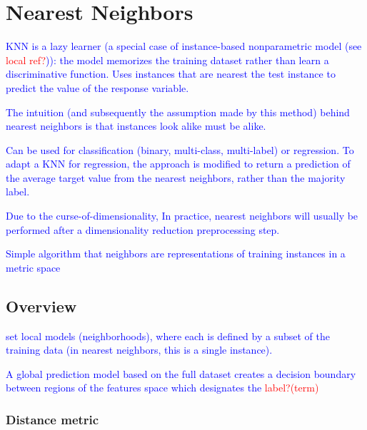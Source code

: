 \section{Nearest Neighbors}

\textcolor{blue}{KNN is a lazy learner (a special case of instance-based nonparametric model (see \textcolor{red}{local ref?})): the model memorizes the training dataset rather than learn a discriminative function. Uses instances that are nearest the test instance to predict the value of the response variable.}

\textcolor{blue}{The intuition (and subsequently the assumption made by this method) behind nearest neighbors is that instances look alike must be alike.}

\textcolor{blue}{Can be used for classification (binary, multi-class, multi-label) or regression. To adapt a KNN for regression, the approach is modified to return a prediction of the average target value from the nearest neighbors, rather than the majority label.}

\textcolor{blue}{Due to the curse-of-dimensionality, In practice, nearest neighbors will usually be performed after a dimensionality reduction preprocessing step.}



\textcolor{blue}{Simple algorithm that neighbors are representations of training instances in a metric space}

\subsection{Overview}



\textcolor{blue}{set local models (neighborhoods), where each is defined by a subset of the training data (in nearest neighbors, this is a single instance).}

\textcolor{blue}{A global prediction model based on the full dataset creates a decision boundary between regions of the features space which designates the \textcolor{red}{label?(term)}}

\subsubsection{Distance metric}

